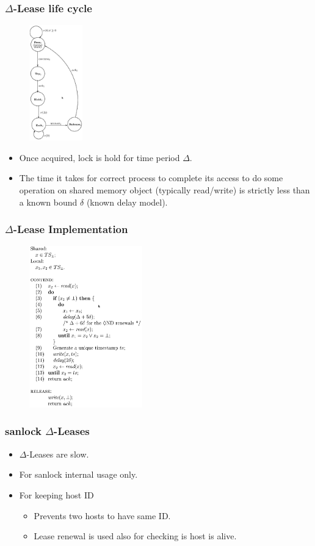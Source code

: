 \documentclass[10pt,utf8]{beamer}
\begin{document}
\begin{frame}
    \frametitle{$\Delta$-Lease life cycle}
    \begin{figure}
        \centering
        \includegraphics[height=5cm]{./img/delta-lease-life-cycle.eps}
    \end{figure}
    
    \centering
    \begin{itemize}
     \item Once acquired, lock is hold for time period $\Delta$.
     \item The time it takes for correct process to complete its access to do some operation on shared memory object (typically read/write) is strictly less than a known bound $\delta$ (known delay model).
    \end{itemize}
\end{frame}

\begin{frame}
    \frametitle{$\Delta$-Lease Implementation}
    \begin{figure}
        \centering
        \includegraphics[height=7cm]{./img/delta-lease-alg.eps}
    \end{figure}
\end{frame}

\begin{frame}
    \frametitle{sanlock $\Delta$-Leases}
    \begin{itemize}
     \item $\Delta$-Leases are slow.
     \item For sanlock internal usage only.
     \item For keeping host ID
     \begin{itemize}
        \item Prevents two hosts to have same ID.
        \item Lease renewal is used also for checking is host is alive.
     \end{itemize}
    \end{itemize}
\end{frame}
\end{document}

